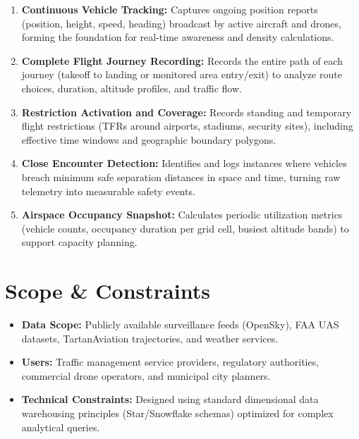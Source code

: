 \documentclass[11pt,a4paper]{article}
\begin{document}
\begin{enumerate}
    \item \textbf{Continuous Vehicle Tracking:} Captures ongoing position reports (position, height, speed, heading) broadcast by active aircraft and drones, forming the foundation for real-time awareness and density calculations.
    \item \textbf{Complete Flight Journey Recording:} Records the entire path of each journey (takeoff to landing or monitored area entry/exit) to analyze route choices, duration, altitude profiles, and traffic flow.
    \item \textbf{Restriction Activation and Coverage:} Records standing and temporary flight restrictions (TFRs around airports, stadiums, security sites), including effective time windows and geographic boundary polygons.
    \item \textbf{Close Encounter Detection:} Identifies and logs instances where vehicles breach minimum safe separation distances in space and time, turning raw telemetry into measurable safety events.
    \item \textbf{Airspace Occupancy Snapshot:} Calculates periodic utilization metrics (vehicle counts, occupancy duration per grid cell, busiest altitude bands) to support capacity planning.
\end{enumerate}

\section{Scope \& Constraints}
\begin{itemize}
    \item \textbf{Data Scope:} Publicly available surveillance feeds (OpenSky), FAA UAS datasets, TartanAviation trajectories, and weather services.
    \item \textbf{Users:} Traffic management service providers, regulatory authorities, commercial drone operators, and municipal city planners.
    \item \textbf{Technical Constraints:} Designed using standard dimensional data warehousing principles (Star/Snowflake schemas) optimized for complex analytical queries.
\end{itemize}
\end{document}

